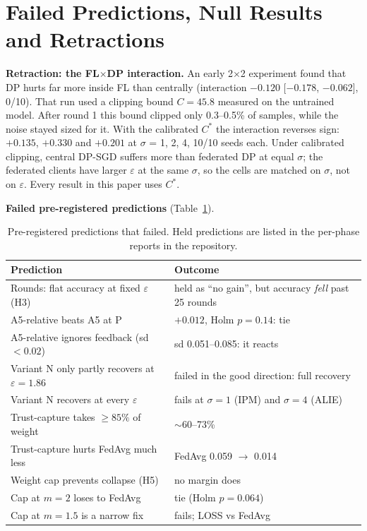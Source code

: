 \documentclass[journal]{IEEEtran}
\newcommand{\eps}{\varepsilon}
\begin{document}
\section{Failed Predictions, Null Results and Retractions}
\label{sec:res-failed}

\textbf{Retraction: the FL$\times$DP interaction.} An early 2$\times$2 experiment found that DP hurts
far more inside FL than centrally (interaction $-0.120$ [$-0.178$, $-0.062$], 0/10). That run used a
clipping bound $C = 45.8$ measured on the untrained model. After round 1 this bound clipped only
0.3--0.5\% of samples, while the noise stayed sized for it. With the calibrated $C^\ast$ the
interaction reverses sign: $+0.135$, $+0.330$ and $+0.201$ at $\sigma$ = 1, 2, 4, 10/10 seeds each.
Under calibrated clipping, central DP-SGD suffers more than federated DP at equal $\sigma$; the
federated clients have larger $\eps$ at the same $\sigma$, so the cells are matched on $\sigma$,
not on $\eps$. Every result in this paper uses $C^\ast$.

\textbf{Failed pre-registered predictions} (Table~\ref{tab:scorecard}).

\begin{table}[t]
\centering
\caption{Pre-registered predictions that failed. Held predictions are listed in the per-phase
reports in the repository.}
\label{tab:scorecard}
\begin{tabular}{@{}p{}p{}@{}}
\toprule
Prediction & Outcome\\
\midrule
Rounds: flat accuracy at fixed $\eps$ (H3) & held as ``no gain'', but accuracy \emph{fell} past 25 rounds\\
A5-relative beats A5 at P & $+0.012$, Holm $p = 0.14$: tie\\
A5-relative ignores feedback (sd $<0.02$) & sd 0.051--0.085: it reacts\\
Variant N only partly recovers at $\eps = 1.86$ & failed in the good direction: full recovery\\
Variant N recovers at every $\eps$ & fails at $\sigma=1$ (IPM) and $\sigma=4$ (ALIE)\\
Trust-capture takes $\ge 85\%$ of weight & $\sim$60--73\%\\
Trust-capture hurts FedAvg much less & FedAvg 0.059 $\to$ 0.014\\
Weight cap prevents collapse (H5) & no margin does\\
Cap at $m=2$ loses to FedAvg & tie (Holm $p = 0.064$)\\
Cap at $m=1.5$ is a narrow fix & fails; LOSS vs FedAvg\\
\bottomrule
\end{tabular}
\end{table}
\end{document}
